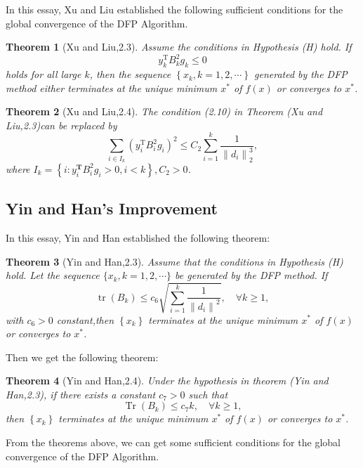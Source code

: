 \documentclass[12pt,a4paper,draft]{article}  %
\newtheorem{theorem}{Theorem}[section]
\theoremstyle{definition}
\numberwithin{equation}{section}
\begin{document}
In this essay, Xu and Liu established the following sufficient conditions for the global convergence of the DFP Algorithm.
\begin{theorem}[Xu and Liu,2.3]
    Assume the conditions in Hypothesis (H) hold. If \begin{equation*}
        y_k^{\mathrm{T}} B_k^2 g_k \leq 0 \tag{2.10}
    \end{equation*}
holds for all large $k$, then the sequence $\left\{x_k, k=1,2, \cdots\right\}$ generated by the DFP method either terminates at the unique minimum $x^*$ of $f(x)$ or converges to $x^*$.
\end{theorem}

\begin{theorem}[Xu and Liu,2.4]
The condition (2.10) in Theorem (Xu and Liu,2.3)can be replaced by \begin{equation*}
    \sum_{i \in I_k}\left(y_i^{\mathrm{T}} B_i^2 g_i\right)^2 \leq C_2 \sum_{i=1}^k \frac{1}{\left\|d_i\right\|_2^3},
\end{equation*}
where $I_k=\left\{i: y_i^{\mathbf{T}} B_i^2 g_i>0, i<k\right\}, C_2>0$.
\end{theorem}



\subsection{Yin and Han's Improvement}

In this essay, Yin and Han established the following theorem:
\begin{theorem}[Yin and Han,2.3]
Assume that the conditions in Hypothesis (H) hold. Let the sequence $\{x_{k}, k=1,2, \cdots\}$ be generated by the DFP method. If
\begin{equation*}
    \operatorname{tr}\left(B_k\right) \leq c_6 \sqrt{\sum_{i=1}^k \frac{1}{\left\|d_i\right\|^2}}, \quad \forall k \geq 1, \tag{2.14}
\end{equation*}
 with $c_6>0$ constant,then $\left\{x_k\right\}$ terminates at the unique minimum $x^{*}$ of $f(x)$ or converges to $x^{*}$.
\end{theorem}

Then we get the following theorem:
\begin{theorem}[Yin and Han,2.4]
    Under the hypothesis in theorem (Yin and Han,2.3), if there exists a constant $c_7>0$ such that \begin{equation*}
        \operatorname{Tr}\left(B_k\right) \leq c_7 k, \quad \forall k \geq 1,
    \end{equation*}
then $\left\{x_k\right\}$ terminates at the unique minimum $x^{*}$ of $f(x)$ or converges to $x^{*}$.
\end{theorem}
    From the theorems above, we can get some sufficient conditions for the global convergence of the DFP Algorithm.
\end{document}
